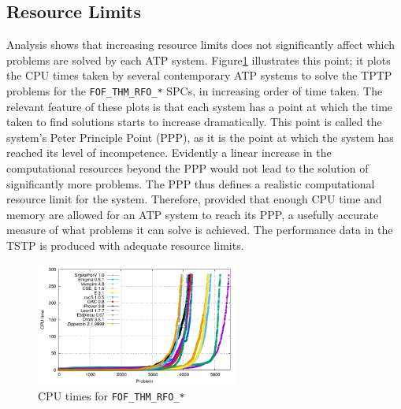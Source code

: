 \documentclass[runningheads]{llncs}
\begin{document}
\subsection{Resource Limits}
\label{ResourceLimits}

Analysis shows that increasing resource limits does not significantly affect which problems 
are solved by each ATP system. 
Figure\ref{PPPPlot} illustrates this point; it plots the CPU times taken by several contemporary 
ATP systems to solve the TPTP problems for the {\tt FOF\_THM\_RFO\_*} SPCs, in increasing order 
of time taken. 
The relevant feature of these plots is that each system has a point at which the time taken to 
find solutions starts to increase dramatically. 
This point is called the system's Peter Principle \cite{PH69} Point (PPP), as it is the point at 
which the system has reached its level of incompetence. 
Evidently a linear increase in the computational resources beyond the PPP would not lead to the 
solution of significantly more problems. 
The PPP thus defines a realistic computational resource limit for the system. 
Therefore, provided that enough CPU time and memory are allowed for an ATP system to reach its 
PPP, a usefully accurate measure of what problems it can solve is achieved.
The performance data in the TSTP is produced with adequate resource limits.

\begin{figure}[t!]
\centering
\includegraphics[width=0.6\textwidth]{Plots/FOF_THM_RFO_PPP/FOF_THM_RFO_PPP}
\vspace*{-1em}
\caption{CPU times for {\tt FOF\_THM\_RFO\_*}}
\label{PPPPlot}
\end{figure}
\end{document}
